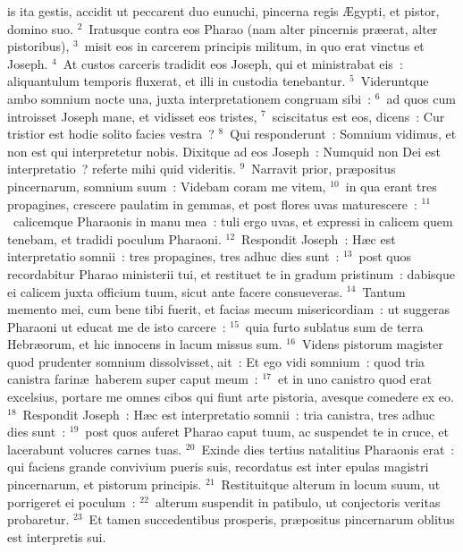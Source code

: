 \bchapter
{}is ita gestis, accidit ut peccarent duo eunuchi, pincerna regis \AE gypti, et pistor, domino suo.
${}^{2}$~Iratusque contra eos Pharao (nam alter pincernis pr\ae erat, alter pistoribus),
${}^{3}$~misit eos in carcerem principis militum, in quo erat vinctus et Joseph.
${}^{4}$~At custos carceris tradidit eos Joseph, qui et ministrabat eis~: aliquantulum temporis fluxerat, et illi in custodia tenebantur.
${}^{5}$~Videruntque ambo somnium nocte una, juxta interpretationem congruam sibi~:
${}^{6}$~ad quos cum introisset Joseph mane, et vidisset eos tristes,
${}^{7}$~sciscitatus est eos, dicens~: Cur tristior est hodie solito facies vestra~?
${}^{8}$~Qui responderunt~: Somnium vidimus, et non est qui interpretetur nobis. Dixitque ad eos Joseph~: Numquid non Dei est interpretatio~? referte mihi quid videritis.
${}^{9}$~Narravit prior, pr\ae positus pincernarum, somnium suum~: Videbam coram me vitem,
${}^{10}$~in qua erant tres propagines, crescere paulatim in gemmas, et post flores uvas maturescere~:
${}^{11}$~calicemque Pharaonis in manu mea~: tuli ergo uvas, et expressi in calicem quem tenebam, et tradidi poculum Pharaoni.
${}^{12}$~Respondit Joseph~: H\ae c est interpretatio somnii~: tres propagines, tres adhuc dies sunt~:
${}^{13}$~post quos recordabitur Pharao ministerii tui, et restituet te in gradum pristinum~: dabisque ei calicem juxta officium tuum, sicut ante facere consueveras.
${}^{14}$~Tantum memento mei, cum bene tibi fuerit, et facias mecum misericordiam~: ut suggeras Pharaoni ut educat me de isto carcere~:
${}^{15}$~quia furto sublatus sum de terra Hebr\ae orum, et hic innocens in lacum missus sum.
${}^{16}$~Videns pistorum magister quod prudenter somnium dissolvisset, ait~: Et ego vidi somnium~: quod tria canistra farin\ae\ haberem super caput meum~:
${}^{17}$~et in uno canistro quod erat excelsius, portare me omnes cibos qui fiunt arte pistoria, avesque comedere ex eo.
${}^{18}$~Respondit Joseph~: H\ae c est interpretatio somnii~: tria canistra, tres adhuc dies sunt~:
${}^{19}$~post quos auferet Pharao caput tuum, ac suspendet te in cruce, et lacerabunt volucres carnes tuas.
${}^{20}$~Exinde dies tertius natalitius Pharaonis erat~: qui faciens grande convivium pueris suis, recordatus est inter epulas magistri pincernarum, et pistorum principis.
${}^{21}$~Restituitque alterum in locum suum, ut porrigeret ei poculum~:
${}^{22}$~alterum suspendit in patibulo, ut conjectoris veritas probaretur.
${}^{23}$~Et tamen succedentibus prosperis, pr\ae positus pincernarum oblitus est interpretis sui.

